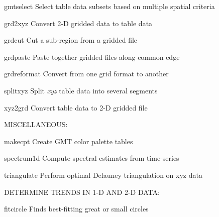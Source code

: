 \documentclass{article}
\begin{document}
\par 	gmtselect	Select table data subsets based on multiple spatial criteria\par 

\par 	grd2xyz	Convert 2-D gridded data to table data\par 

\par 	grdcut	Cut a sub-region from a gridded file\par 

\par 	grdpaste	Paste together gridded files along common edge\par 

\par 	grdreformat	Convert from one grid format to another\par 

\par 	splitxyz	Split {\it xyz} table data into several segments\par 

\par 	xyz2grd	Convert table data to 2-D gridded file\par 

\par \par 

\par MISCELLANEOUS:\par 

\par 	makecpt	Create GMT color palette tables\par 

\par 	spectrum1d	Compute spectral estimates from time-series\par 

\par 	triangulate	Perform optimal Delauney triangulation on xyz data\par 

\par \par 

\par DETERMINE TRENDS IN 1-D AND 2-D DATA:\par 

\par 	fitcircle	Finds best-fitting great or small circles\par 
\end{document}

